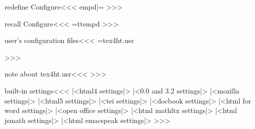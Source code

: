 \<redefine Configure\><<<
\let\:tempd|=\Configure
\def\Configure#1#2{%
   \:CheckOption{#1}\if:Option \def\:tempc{#2}\fi}
>>>

\<recall Configure\><<<
\let\Configure|=\:tempd
>>>


\<user's configuration files\><<<
=tex4ht.usr  \else {} 
   
\fi
>>>

\<note about tex4ht.usr\><<<
>>>


\<built-in settings\><<<
|<html4 settings|>
|<0.0 and 3.2 settings|>
|<mozilla settings|>
|<html5 settings|>
|<tei settings|>
|<docbook settings|>
|<html for word settings|>
|<open office settings|>
|<html mathltx settings|>
|<html jsmath settings|>
|<html emacspeak settings|>
>>>




